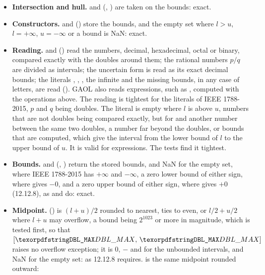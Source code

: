 \begin{itemize}
\item[$\bullet$] \textbf{Intersection and hull.}  and
   (, ) are taken on the
  bounds: exact.
\item[$\bullet$] \textbf{Constructors.}  and
   () store the bounds, and the
  empty set where $l>u$, $l=+\infty$, $u=-\infty$ or a bound is NaN:
  exact.
\item[$\bullet$] \textbf{Reading.}  and
   () read the numbers, decimal,
  hexadecimal, octal or binary, compared exactly with the doubles around
  them; the rational numbers $p/q$ are divided as intervals; the uncertain
  form is read as its exact decimal bounds; the literals \code{[ ]},
  \code{[empty]}, \code{[entire]}, the infinite and the missing bounds, in
  any case of letters, are read (). GAOL also
  reads expressions, such as , computed with the
  operations above. The reading is tightest for the literals of IEEE
  1788-2015, $p$ and $q$ being doubles. The literal \code{[l, u]} is empty
  where $l$ is above $u$, numbers that are not doubles being compared
  exactly, but for  and another number between the same two
  doubles, a number far beyond the doubles, or bounds that are computed,
  which give the interval from the lower bound of $l$ to the upper bound of
  $u$.\newinvfive{} It is valid for expressions. The tests find it
  tightest.
\item[$\bullet$] \textbf{Bounds.}  and 
  (, ) return the stored bounds, and NaN for the empty
  set, where IEEE 1788-2015 has $+\infty$ and $-\infty$, a zero lower bound of either sign, where  gives $-0$, and a zero
  upper bound of either sign, where  gives $+0$ (12.12.8), as
   and  do: exact.
\item[$\bullet$] \textbf{Midpoint.}  () is
  $(l+u)/2$ rounded to nearest, ties to even, or $l/2+u/2$ where $l+u$ may
  overflow, a bound being $2^{1023}$ or more in magnitude, which is tested
  first, so that $\itv{\code{DBL\_MAX}}{\code{DBL\_MAX}}$ raises no
  overflow exception;\newinvfive{} it is $0$, $-$ and
   for the unbounded intervals, and NaN for the empty set:
  as 12.12.8 requires.  is the same midpoint rounded outward:

\end{itemize}

